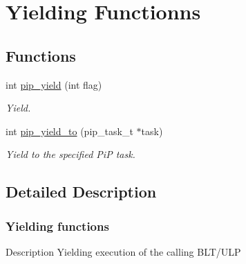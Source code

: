 \hypertarget{group__ulp-0-yield}{\section{Yielding Functionns}
\label{group__ulp-0-yield}
}
\subsection*{Functions}
\begin{DoxyCompactItemize}
\item 
int \hyperlink{group__ulp-0-yield_ga50469f21446ce86ea18ddd282cf15894}{pip\-\_\-yield} (int flag)
\begin{DoxyCompactList}\small\item\em Yield. \end{DoxyCompactList}\item 
int \hyperlink{group__ulp-0-yield_gac30cf124b28a8d80dac34c5e1bdb66ba}{pip\-\_\-yield\-\_\-to} (pip\-\_\-task\-\_\-t $\ast$task)
\begin{DoxyCompactList}\small\item\em Yield to the specified Pi\-P task. \end{DoxyCompactList}\end{DoxyCompactItemize}


\subsection{Detailed Description}
\hypertarget{pip-yield}{}\subsubsection{Yielding functions}\label{pip-yield}
\begin{DoxyParagraph}{Description}
Yielding execution of the calling B\-L\-T/\-U\-L\-P 
\end{DoxyParagraph}


